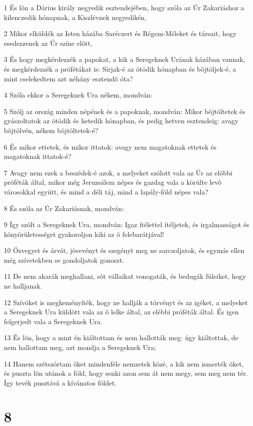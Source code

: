 \par 1 És lõn a Dárius király negyedik esztendejében, hogy szóla az Úr Zakariáshoz a kilenczedik hónapnak, a Kiszlévnek negyedikén,
\par 2 Mikor elküldék az Isten házába Saréczert és Régem-Méleket és társait, hogy esedezzenek az Úr színe elõtt,
\par 3 És hogy megkérdezzék a papokat, a kik a Seregeknek Urának házában vannak, és megkérdezzék a prófétákat is: Sírjak-é az ötödik hónapban és bõjtöljek-é, a mint cselekedtem azt néhány esztendõ óta?
\par 4 Szóla ekkor a Seregeknek Ura nékem, mondván:
\par 5 Szólj az ország minden népének és a papoknak, mondván: Mikor bõjtöltetek és gyászoltatok az ötödik és hetedik hónapban, és pedig hetven esztendeig: avagy bõjtölvén, nékem bõjtöltetek-é?
\par 6 És mikor ettetek, és mikor ittatok: avagy nem magatoknak ettetek és magatoknak ittatok-é?
\par 7 Avagy nem ezek a beszédek-é azok, a melyeket szólott vala az Úr az elõbbi próféták által, mikor még Jeruzsálem népes és gazdag vala a körülte levõ városokkal együtt, és mind a déli táj, mind a lapály-föld népes vala?
\par 8 És szóla az Úr Zakariásnak, mondván:
\par 9 Így szólt a Seregeknek Ura, mondván: Igaz ítélettel ítéljetek, és irgalmasságot és könyörületességet gyakoroljon kiki az õ felebarátjával!
\par 10 Özvegyet és árvát, jövevényt és szegényt meg ne sarczoljatok, és egymás ellen még szívetekben se gondoljatok gonoszt.
\par 11 De nem akarák meghallani, sõt vállaikat vonogaták, és bedugák füleiket, hogy ne halljanak.
\par 12 Szívöket is megkeményíték, hogy ne hallják a törvényt és az igéket, a melyeket a Seregeknek Ura küldött vala az õ lelke által, az elébbi próféták által. És igen felgerjedt vala a Seregeknek Ura.
\par 13 És lõn, hogy a mint én kiáltottam és nem hallották meg: úgy kiáltottak, de nem hallottam meg, azt mondja a Seregeknek Ura;
\par 14 Hanem szétszórtam õket mindenféle nemzetek közé, a kik nem ismerték õket, és puszta lõn utánok a föld, hogy senki azon sem át nem megy, sem meg nem tér. Így tevék pusztává a kívánatos földet.

\chapter{8}

